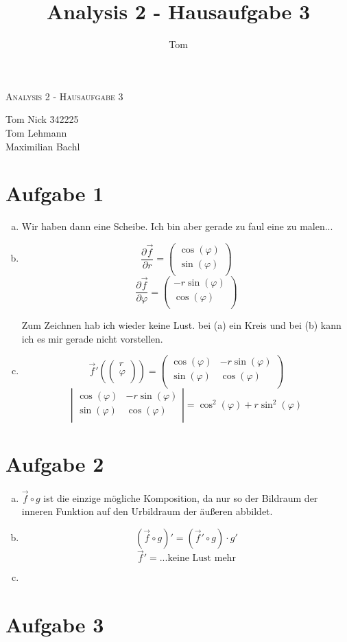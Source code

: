 \documentclass[10pt,a4paper,parskip=half]{scrartcl}
\author{Tom}
\title{Analysis 2 - Hausaufgabe 3}
\newcommand{\vectwo}[2]{\left(\begin {array} {c}#1\\#2\\\end {array} \right)}
\newcommand{\mattwotwo}[4]{\left(\begin {array} {cc}#1 & #3\\#2 & #4\\\end {array} \right)}
\newcommand{\dettwotwo}[4]{\left|\begin {array} {cc}#1 & #3\\#2 & #4\\\end {array} \right|}
\begin{document}
\begin{center}
\textsc{\Large{Analysis 2 - Hausaufgabe 3}} \\
\end{center}
\begin{tabbing}
Tom Nick \hspace{1.4cm}\= 342225\\
Tom Lehmann\\
Maximilian Bachl
\end{tabbing}
\section*{Aufgabe 1}
\begin{enumerate}[(a)]
\item
Wir haben dann eine Scheibe. Ich bin aber gerade zu faul eine zu malen...
\item
$$ \frac{\partial \vec f}{\partial r} = \vectwo{\cos(\varphi)}{\sin(\varphi)}$$
$$ \frac{\partial \vec f}{\partial \varphi} = \vectwo{-r\sin(\varphi)}{\cos(\varphi)}$$

Zum Zeichnen hab ich wieder keine Lust. bei (a) ein Kreis und bei (b) kann ich es mir gerade nicht vorstellen.
\item
$$ \vec f'(\vectwo{r}{\varphi}) = \mattwotwo{\cos(\varphi)}{\sin(\varphi)}{-r\sin(\varphi)}{\cos(\varphi)} $$
$$\dettwotwo{\cos(\varphi)}{\sin(\varphi)}{-r\sin(\varphi)}{\cos(\varphi)} = \cos^2(\varphi) + r\sin^2(\varphi)$$
\end{enumerate}
\section*{Aufgabe 2}
\begin{enumerate}[(a)]
\item
$\vec f \circ g$ ist die einzige mögliche Komposition, da nur so der Bildraum der inneren Funktion auf den Urbildraum der äußeren abbildet.
\item
$$ (\vec f \circ g)' = (\vec f' \circ g) \cdot g'$$
$$ \vec f' = ... \text{keine Lust mehr} $$
\item
\end{enumerate}
\section*{Aufgabe 3}
\end{document}
